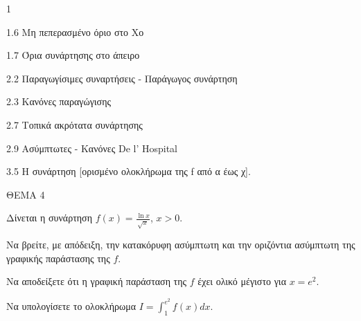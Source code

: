 \begin{ylh}{1}
    \item 1.6 Μη πεπερασμένο όριο στο Χο
    \item 1.7 Όρια συνάρτησης στο άπειρο
    \item 2.2 Παραγωγίσιμες συναρτήσεις - Παράγωγος συνάρτηση
    \item 2.3 Κανόνες παραγώγισης
    \item 2.7 Τοπικά ακρότατα συνάρτησης
    \item 2.9 Ασύμπτωτες - Κανόνες De l’ Hospital
    \item 3.5 Η συνάρτηση [ορισμένο ολοκλήρωμα της f από α έως χ].
\end{ylh}
ΘΕΜΑ 4

Δίνεται η συνάρτηση $f(x) = \frac{\ln x}{\sqrt{x}}$, $x > 0$.

\begin{alist}
\item Να βρείτε, με απόδειξη, την κατακόρυφη ασύμπτωτη και την οριζόντια ασύμπτωτη της γραφικής παράστασης της $f$. 
\item Να αποδείξετε ότι η γραφική παράσταση της $f$ έχει ολικό μέγιστο για $x = e^2$. 
\item Να υπολογίσετε το ολοκλήρωμα $I = \int_{1}^{e^2} f(x)dx$. 
\end{alist}